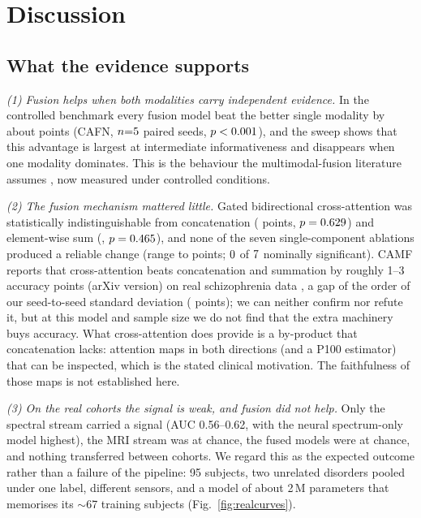 \documentclass{ieeeaccessapprox}
\begin{document}
\section{Discussion}\label{sec:discussion}
\subsection{What the evidence supports}
\emph{(1) Fusion helps when both modalities carry independent evidence.} In the controlled benchmark every fusion model beat the better single modality by about \gainUni{} points (CAFN, $n{=}5$ paired seeds, $p<0.001$), and the sweep shows that this advantage is largest at intermediate informativeness and disappears when one modality dominates. This is the behaviour the multimodal-fusion literature assumes \cite{calhoun2016,baltrusaitis2019}, now measured under controlled conditions.

\emph{(2) The fusion mechanism mattered little.} Gated bidirectional cross-attention was statistically indistinguishable from concatenation (\dCat{} points, $p=0.629$) and element-wise sum (\dSum{}, $p=0.465$), and none of the seven single-component ablations produced a reliable change (range \ablMin{} to \ablMax{} points; $0$ of $7$ nominally significant). CAMF reports that cross-attention beats concatenation and summation by roughly 1--3 accuracy points (arXiv version) on real schizophrenia data \cite{zhou2024camf}, a gap of the order of our seed-to-seed standard deviation (\sdAll{} points); we can neither confirm nor refute it, but at this model and sample size we do not find that the extra machinery buys accuracy. What cross-attention does provide is a by-product that concatenation lacks: attention maps in both directions (and a P100 estimator) that can be inspected, which is the stated clinical motivation. The faithfulness of those maps is not established here.

\emph{(3) On the real cohorts the signal is weak, and fusion did not help.} Only the spectral stream carried a signal (AUC 0.56--0.62, with the neural spectrum-only model highest), the MRI stream was at chance, the fused models were at chance, and nothing transferred between cohorts. We regard this as the expected outcome rather than a failure of the pipeline: 95 subjects, two unrelated disorders pooled under one label, different sensors, and a model of about 2\,M parameters that memorises its $\sim$67 training subjects (Fig.~\ref{fig:realcurves}).
\end{document}
